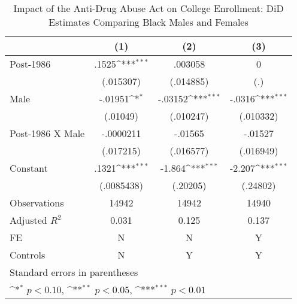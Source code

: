 \begin{table}[htbp]\centering
\def\sym#1{\ifmmode^{#1}\else\(^{#1}\)\fi}
\caption{Impact of the Anti-Drug Abuse Act on College Enrollment: DiD Estimates Comparing Black Males and Females}
\begin{tabular}{l*{3}{c}}
\hline\hline
                    &\multicolumn{1}{c}{(1)}         &\multicolumn{1}{c}{(2)}         &\multicolumn{1}{c}{(3)}         \\
\hline
Post-1986           &       .1525\sym{***}&     .003058         &           0         \\
                    &   (.015307)         &   (.014885)         &         (.)         \\
[1em]
Male                &     -.01951\sym{*}  &     -.03152\sym{***}&      -.0316\sym{***}\\
                    &    (.01049)         &   (.010247)         &   (.010332)         \\
[1em]
Post-1986 X Male    &   -.0000211         &     -.01565         &     -.01527         \\
                    &   (.017215)         &   (.016577)         &   (.016949)         \\
[1em]
Constant            &       .1321\sym{***}&      -1.864\sym{***}&      -2.207\sym{***}\\
                    &  (.0085438)         &    (.20205)         &    (.24802)         \\
\hline
Observations        &       14942         &       14942         &       14940         \\
Adjusted \(R^{2}\)  &       0.031         &       0.125         &       0.137         \\
FE                  &           N         &           N         &           Y         \\
Controls            &           N         &           Y         &           Y         \\
\hline\hline
\multicolumn{4}{l}{\footnotesize Standard errors in parentheses}\\
\multicolumn{4}{l}{\footnotesize \sym{*} \(p<0.10\), \sym{**} \(p<0.05\), \sym{***} \(p<0.01\)}\\
\end{tabular}
\end{table}

